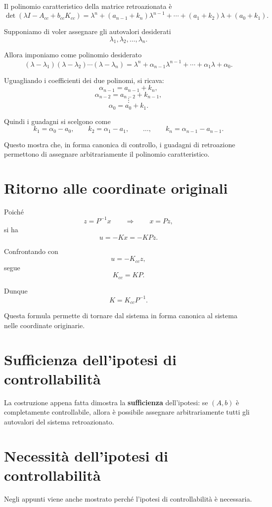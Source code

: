 Il polinomio caratteristico della matrice retroazionata è
\[
\det(\lambda I-A_{cc}+b_{cc}K_{cc})
=
\lambda^n
+(a_{n-1}+k_n)\lambda^{n-1}
+\cdots
+(a_1+k_2)\lambda
+(a_0+k_1).
\]

Supponiamo di voler assegnare gli autovalori desiderati
\[
\lambda_1,\lambda_2,\dots,\lambda_n.
\]

Allora imponiamo come polinomio desiderato
\[
(\lambda-\lambda_1)(\lambda-\lambda_2)\cdots(\lambda-\lambda_n)
=
\lambda^n+\alpha_{n-1}\lambda^{n-1}+\cdots+\alpha_1\lambda+\alpha_0.
\]

Uguagliando i coefficienti dei due polinomi, si ricava:
\[
\alpha_{n-1}=a_{n-1}+k_n,
\]
\[
\alpha_{n-2}=a_{n-2}+k_{n-1},
\]
\[
\vdots
\]
\[
\alpha_0=a_0+k_1.
\]

Quindi i guadagni si scelgono come
\[
k_1=\alpha_0-a_0,
\qquad
k_2=\alpha_1-a_1,
\qquad
\dots,
\qquad
k_n=\alpha_{n-1}-a_{n-1}.
\]

Questo mostra che, in forma canonica di controllo, i guadagni di retroazione
permettono di assegnare arbitrariamente il polinomio caratteristico.

\section{Ritorno alle coordinate originali}

Poiché
\[
z=P^{-1}x
\qquad\Longrightarrow\qquad
x=Pz,
\]
si ha
\[
u=-Kx=-KPz.
\]

Confrontando con
\[
u=-K_{cc}z,
\]
segue
\[
K_{cc}=KP.
\]

Dunque
\[
K=K_{cc}P^{-1}.
\]

Questa formula permette di tornare dal sistema in forma canonica
al sistema nelle coordinate originarie.

\section{Sufficienza dell'ipotesi di controllabilità}

La costruzione appena fatta dimostra la \textbf{sufficienza} dell'ipotesi:
se \((A,b)\) è completamente controllabile,
allora è possibile assegnare arbitrariamente tutti gli autovalori del sistema retroazionato.

\section{Necessità dell'ipotesi di controllabilità}

Negli appunti viene anche mostrato perché l'ipotesi di controllabilità è necessaria.

